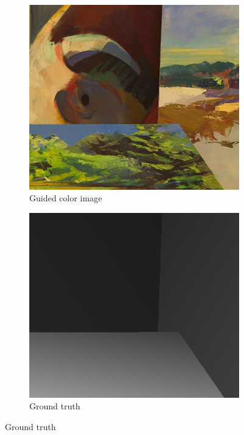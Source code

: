 \documentclass[preprint,10pt,5p,times,twocolumn]{elsarticle}
\begin{document}
\begin{figure}[t]
\centering
\begin{subfigure}[t]{0.485\linewidth}
\includegraphics[width=\linewidth]{bull_color.png}
\caption{Guided color image}
\end{subfigure}
\begin{subfigure}[t]{0.485\linewidth}
\includegraphics[width=\linewidth]{bull_depth.png}
\caption{Ground truth}
\end{subfigure}


\end{figure}
\end{document}

